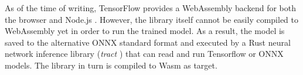 As of the time of writing, TensorFlow \cite{tensorflow} provides a WebAssembly backend for both the browser and Node.js \cite{tf-wasm}. However, the library itself cannot be easily compiled to WebAssembly yet in order to run the trained model. As a result, the model is saved to the alternative ONNX \cite{onnx} standard format and executed by a Rust neural network inference library (\emph{tract} \cite{tract}) that can read and run Tensorflow or ONNX models. The library in turn is compiled to Wasm as target.






